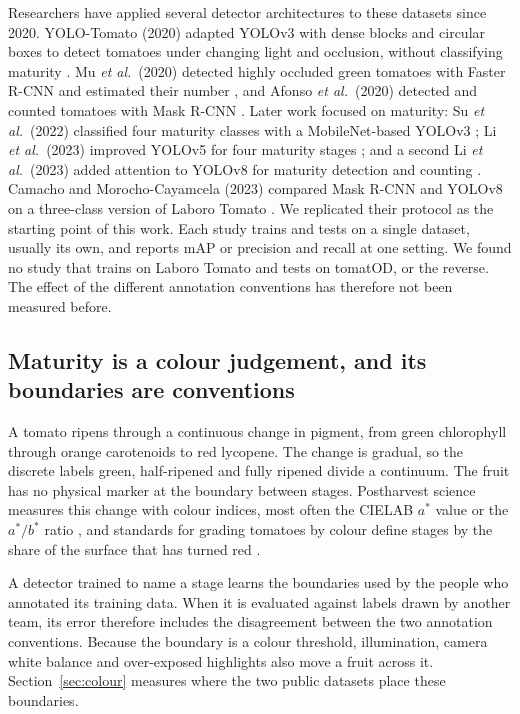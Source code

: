 Researchers have applied several detector architectures to these datasets since
2020. YOLO-Tomato (2020) adapted YOLOv3 with dense blocks and circular boxes
to detect tomatoes under changing light and occlusion, without classifying maturity
\cite{liu2020yolotomato}. Mu \emph{et al.}\ (2020) detected highly occluded
green tomatoes with Faster R-CNN and estimated their number
\cite{mu2020occluded}, and Afonso \emph{et al.}\ (2020) detected and counted
tomatoes with Mask R-CNN \cite{afonso2020tomato}. Later work focused on
maturity: Su \emph{et al.}\ (2022) classified four maturity classes with a
MobileNet-based YOLOv3 \cite{su2022seyolov3}; Li \emph{et al.}\ (2023) improved
YOLOv5 for four maturity stages \cite{li2023yolov5tomato}; and a second Li
\emph{et al.}\ (2023) added attention to YOLOv8 for maturity detection and
counting \cite{li2023mhsayolov8}. Camacho and Morocho-Cayamcela (2023) compared
Mask R-CNN and YOLOv8 on a three-class version of Laboro Tomato
\cite{camacho2023tomato}. We replicated their protocol as the starting point of
this work. Each study trains and tests on a single dataset, usually its own, and
reports mAP or precision and recall at one setting. We found no study that
trains on Laboro Tomato and tests on tomatOD, or the reverse. The effect of the
different annotation conventions has therefore not been measured before.

\subsection{Maturity is a colour judgement, and its boundaries are conventions}

A tomato ripens through a continuous change in pigment, from green chlorophyll
through orange carotenoids to red lycopene. The change is gradual, so the
discrete labels green, half-ripened and fully ripened divide a continuum. The
fruit has no physical marker at the boundary between stages.
Postharvest science measures this change with colour indices, most often the
CIELAB $a^*$ value or the $a^*/b^*$ ratio \cite{lopezcamelo2004color}, and
standards for grading tomatoes by colour define stages by the share of the
surface that has turned red \cite{usda1991tomato}.

A detector trained to name a stage learns the boundaries used by the people who
annotated its training data. When it is evaluated against labels drawn by
another team, its error therefore includes the disagreement between the two
annotation conventions. Because the boundary is a colour threshold,
illumination, camera white balance and over-exposed highlights also move a
fruit across it. Section~\ref{sec:colour} measures where the two public datasets
place these boundaries.

